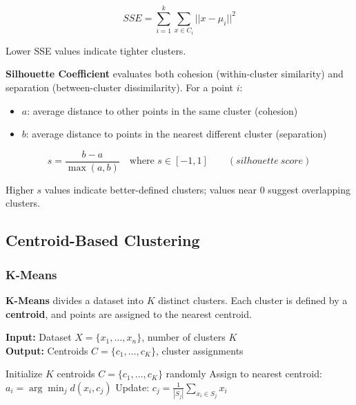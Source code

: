 \begin{equation}
    SSE = \sum_{i=1}^{k} \sum_{x \in C_i} ||x - \mu_i||^2
\end{equation}

Lower SSE values indicate tighter clusters.

\textbf{Silhouette Coefficient} evaluates both cohesion (within-cluster similarity) and separation (between-cluster dissimilarity). For a point $i$:

\begin{itemize}
    \item $a$: average distance to other points in the same cluster (cohesion)
    \item $b$: average distance to points in the nearest different cluster (separation)
\end{itemize}

\begin{equation}
    s = \frac{b - a}{\max(a, b)} \quad \text{where } s \in [-1, 1] \qquad (silhouette~score)
\end{equation}

Higher $s$ values indicate better-defined clusters; values near 0 suggest overlapping clusters.


\subsection{Centroid-Based Clustering}
\subsubsection{K-Means}
\textbf{K-Means} divides a dataset into $K$ distinct clusters. Each cluster is defined by a \textbf{centroid}, and points are assigned to the nearest centroid.

\begin{algorithm}
\caption{K-Means Clustering}
\textbf{Input:} Dataset $X = \{x_1, \dots, x_n\}$, number of clusters $K$ \\
\textbf{Output:} Centroids $C = \{c_1, \dots, c_K\}$, cluster assignments
\begin{algorithmic}[1]
\State Initialize $K$ centroids $C = \{c_1, \dots, c_K\}$ randomly
\Repeat
        \State Assign to nearest centroid: $a_i = \arg\min_j d(x_i, c_j)$
    \EndFor
        \State Update: $c_j = \frac{1}{|S_j|} \sum_{x_i \in S_j} x_i$
    \EndFor
{}
\end{algorithmic}
\end{algorithm}

